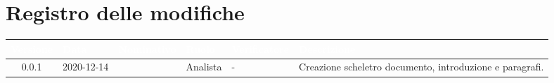 \section*{Registro delle modifiche}
{
\renewcommand{\arraystretch}{1.5}
\centering
\begin{longtable}{c C{2.6cm} C{2.6cm} C{2.6cm} C{2.6cm} C{3.5cm}}
\textcolor{white}{\textbf{Versione}}&
\textcolor{white}{\textbf{Data}}&
\textcolor{white}{\textbf{Nominativo}}&
\textcolor{white}{\textbf{Ruolo}}&
\textcolor{white}{\textbf{Verificatore}}&
\textcolor{white}{\textbf{Descrizione}}\\	
\endhead
		
0.0.1 & 2020-12-14 & \ZM{} & Analista & - & Creazione scheletro documento, introduzione e paragrafi. \\
		
\end{longtable}
}
